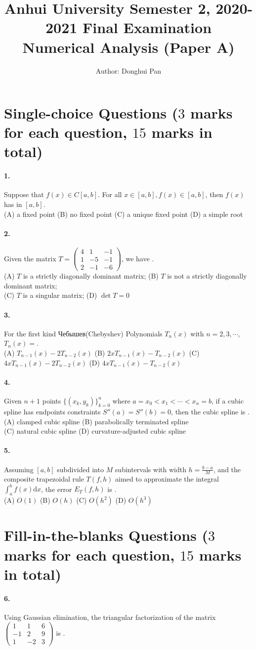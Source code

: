 \documentclass{article}
\title{Anhui University Semester 2, 2020-2021 Final Examination\\ Numerical Analysis (Paper A)}
\author{Author: Donghui Pan}
\date{}
\newcommand\ptsMulti[3]{ \textnormal{\small{($#2$ marks for each question, $#3$ marks in total)}}}
\newcommand{\shortline}{\underline{\hspace{1cm}}}
\newcommand{\longline}{\underline{\hspace{2cm}}}
\renewcommand{\d}{\mathrm{d}}
\newcommand{\ds}{\displaystyle}
\newcommand{\bfA}{\vspace{5pt}\\ (A) }
\newcommand{\bfB}{\qquad (B) }
\newcommand{\bfC}{\qquad (C) }
\newcommand{\bfD}{\qquad (D) }
\newcommand{\para}[1]{\paragraph{#1.}\hspace{-10pt}}
\begin{document}
    \maketitle
    \section{Single-choice Questions\ptsMulti{5}{3}{15}}
    \para{1}Suppose that $f(x)\in C[a,b]$. For all $x\in [a,b], f(x)\in [a,b]$, then $f(x)$ has \shortline in $[a,b]$.
    \bfA a fixed point \bfB no fixed point \bfC a unique fixed point \bfD a simple root

    \para{2}Given the matrix $\ds T=\begin{pmatrix}
        4 & 1 & -1\\ 1 & -5 & -1\\ 2& -1 & -6
    \end{pmatrix}$, we have \shortline.
    \bfA $T$ is a strictly diagonally dominant matrix;
    \bfB $T$ is not a strictly diagonally dominant matrix;\\ 
    \bfC $T$ is a singular matrix;\hspace{3.2cm}
    \bfD $\det T=0$

    \para{3}For the first kind Чебышев(Chebyshev) Polynomials $T_n(x)$ with $n=2,3,\cdots$, $T_n(x)=$\shortline .
    \bfA $T_{n-1}(x)-2T_{n-2}(x)$ \bfB $2xT_{n-1}(x)-T_{n-2}(x)$ \bfC $4xT_{n-1}(x)-2T_{n-2}(x)$ \bfD $4xT_{n-1}(x)-T_{n-2}(x)$

    \para{4}Given $n+1$ points $\{(x_k,y_k)\}_{k=0}^n$ where $a=x_0<x_1<\cdots<x_n=b$, if a cubic spline has endpoints constraints $S''(a)=S''(b)=0$, then the cubic spline is \shortline.
    \bfA clamped cubic spline \bfB parabolically terminated spline\\ 
    \bfC natural cubic spline \hspace{5pt}\bfD curvature-adjusted cubic spline

    \para{5}Assuming $[a,b]$ subdivided into $M$ subintervals with width $\ds h=\frac{b-a}{M}$, and the composite trapezoidal rule $T(f,h)$ aimed to approximate the integral $\ds \int_a^b f(x) \d x$, the error $E_T(f,h)$ is \shortline.
    \bfA $O(1)$ \bfB $O(h)$ \bfC $O(h^2)$ \bfD $O(h^3)$

    \section{Fill-in-the-blanks Questions\ptsMulti{5}{3}{15}}
    \para{6}Using Gaussian elimination, the triangular factorization of the matrix $\ds \begin{pmatrix}
        1 & 1 & 6\\ -1 & 2 & 9\\ 1& -2 & 3
    \end{pmatrix}$ is \longline\longline.
\end{document}
